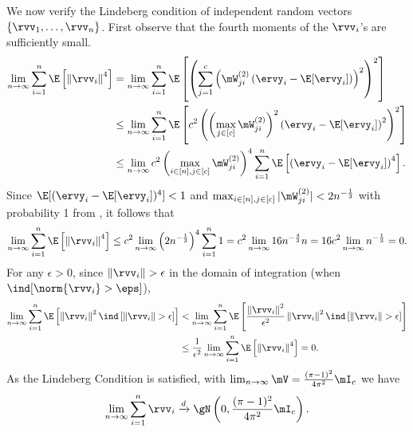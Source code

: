 \begin{proofof}{}
We now verify the Lindeberg condition of independent random vectors $\{\rvv_1,\ldots, \rvv_n\}$.
First observe that the fourth moments of the $\rvv_i$'s are sufficiently small.
\begin{equation}
\begin{split}
    \lim_{n\to\infty}\sum_{i=1}^n\E\left[\left\Vert\rvv_i\right\Vert^4\right] &= \lim_{n\to\infty}\sum_{i=1}^n\E\left[\left(\sum_{j=1}^c \left(\mW^{(2)}_{ji}\left(\ervy_i - \E[\ervy_i]\right)\right)^2\right)^2\right]\\
    & \leq\lim_{n\to\infty} \sum_{i=1}^n\E\left[c^2\left(\left(\max_{j\in[c]}\mW^{(2)}_{ji}\right)^2\left(\ervy_i - \E[\ervy_i]\right)^2\right)^2\right]\\
    & \leq\lim_{n\to\infty} c^2\left(\max_{i\in[n],j\in[c]}\mW^{(2)}_{ji}\right)^4\sum_{i=1}^n\E\left[\left(\ervy_i - \E[\ervy_i]\right)^4\right].
\end{split}
\end{equation}
Since $\E[(\ervy_i - \E[\ervy_i])^4] < 1$ and $\max_{i\in[n],j\in[c]}|\mW^{(2)}_{ji}| < 2n^{-\frac13}$ with probability 1 from , it follows that
\begin{equation}
\begin{split}
    \lim_{n\to\infty}\sum_{i=1}^n\E\left[\left\Vert\rvv_i\right\Vert^4\right] \leq c^2\lim_{n\to\infty}\left(2n^{-\frac13}\right)^4\sum_{i=1}^n 1 = c^2 \lim_{n\to\infty}16n^{-\frac43}n =  16c^2 \lim_{n\to\infty}n^{-\frac13} =0.
\end{split}
\end{equation}
For any $\epsilon > 0$, since $\left\Vert\rvv_{i}\right\Vert > \epsilon$ in the domain of integration (when $\ind[\norm{\rvv_i} > \eps]$),
\begin{equation}
\begin{split}
\lim_{n\to\infty}\sum_{i=1}^n\E\left[\left\Vert\rvv_i\right\Vert^2\ind\left[\left\Vert\rvv_{i}\right\Vert > \epsilon\right]\right] & < \lim_{n\to\infty}\sum_{i=1}^n\E\left[\frac{\left\Vert\rvv_i\right\Vert^2}{\epsilon^2}\left\Vert\rvv_i\right\Vert^2\ind\left[\left\Vert\rvv_{i}\right\Vert > \epsilon\right]\right]\\
&\leq \frac{1}{\epsilon^2}\lim_{n\to\infty}\sum_{i=1}^n\E\left[\left\Vert\rvv_i\right\Vert^4\right] = 0.
\end{split}
\end{equation}
As the Lindeberg Condition is satisfied, with $\lim_{n\to\infty}\mV = \frac{(\pi-1)^2}{4\pi^2}\mI_c$ we have
\begin{equation}
\label{eqn:lemma:sumv-convergence}
    \lim_{n\to\infty}\sum_{i=1}^n\rvv_i\xrightarrow{d}\gN\left(0,\frac{(\pi-1)^2}{4\pi^2}\mI_c\right).
\end{equation}


\end{proofof}

